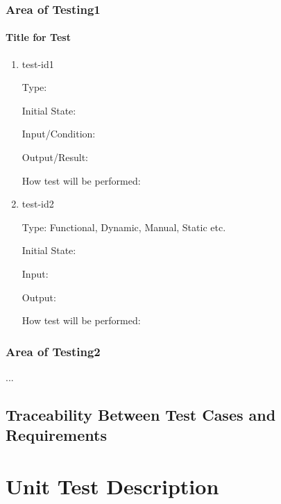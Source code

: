 \documentclass[12pt, titlepage]{article}
\begin{document}

\subsubsection{Area of Testing1}
		
\paragraph{Title for Test}

\begin{enumerate}

\item{test-id1\\}

Type: 
					
Initial State: 
					
Input/Condition: 
					
Output/Result: 
					
How test will be performed: 
					
\item{test-id2\\}

Type: Functional, Dynamic, Manual, Static etc.
					
Initial State: 
					
Input: 
					
Output: 
					
How test will be performed: 

\end{enumerate}

\subsubsection{Area of Testing2}

...

\subsection{Traceability Between Test Cases and Requirements}



\section{Unit Test Description}
\end{document}
